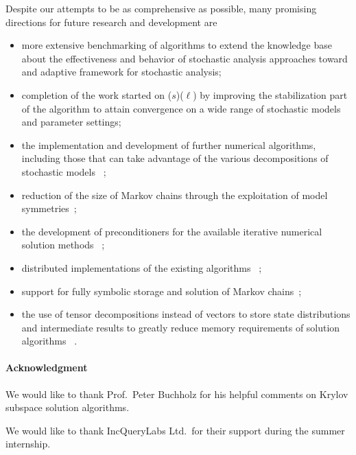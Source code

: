 Despite our attempts to be as comprehensive as possible, many
promising directions for future research and development are
\begin{itemize}
\item more extensive benchmarking of algorithms to extend the
  knowledge base about the effectiveness and behavior of stochastic
  analysis approaches toward and adaptive framework for stochastic
  analysis;
\item completion of the work started on
  ($s$)($\ell$) by improving the
  stabilization part
  \citep{sleijpen1995maintaining,sonneveld2010convergence} of the
  algorithm to attain convergence on a wide range of stochastic models
  and parameter settings;
\item the implementation and development of further numerical
  algorithms, including those that can take advantage of the various
  decompositions of stochastic models~%
  \citep{buchholz1999structured,buchholz2000multilevel,%
    dayar2012analyzing};
\item reduction of the size of Markov chains through the exploitation
  of model symmetries~\citep{buchholz1994exact,haddad1995evaluation};
\item the development of preconditioners for the available iterative
  numerical solution methods~%
  \citep{DBLP:journals/informs/LangvilleS04};
\item distributed implementations of the existing algorithms~%
  \citep{DBLP:conf/imcsit/BylinaB08};
\item support for fully symbolic storage and solution of Markov
  chains~\citep{DBLP:journals/sigmetrics/CiardoM05,%
  DBLP:conf/qest/ZhaoC12,DBLP:conf/qest/2012};
\item the use of tensor decompositions instead of vectors to store
  state distributions and intermediate results to greatly reduce
  memory requirements of solution algorithms~%
  \citep{grasedyck2013literature,ballani2013projection,%
  dolgov2013tt}.
\end{itemize}

\paragraph{Acknowledgment} We would like to thank Prof.~Peter
Buchholz for his helpful comments on Krylov subspace solution
algorithms.

We would like to thank IncQueryLabs Ltd.~for their support during the
summer internship.
